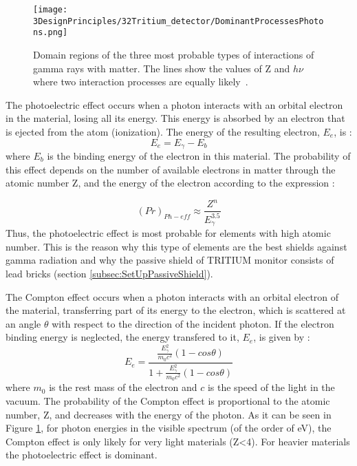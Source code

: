 \begin{figure}[h]
\centering
\texttt{[image: 3DesignPrinciples/32Tritium\_detector/DominantProcessesPhotons.png]}
\caption{Domain regions of the three most probable types of interactions of gamma rays with matter. The lines show the values of Z and $h\nu$ where two interaction processes are equally likely\label{fig:ProcessesPhotons}~\cite{Knoll}.}
\end{figure}

The photoelectric effect occurs when a photon interacts with an orbital electron in the material, losing all its energy. This energy is absorbed by an electron that is ejected from the atom (ionization). The energy of the resulting electron, $E_e$, is \cite{Knoll, Leo}:
\begin{equation}
E_e = E_\gamma - E_b 
\label{eq:PhotoelectricEffect}
\end{equation}
where $E_b$ is the binding energy of the electron in this material. The probability of this effect depends on the number of available electrons in matter through the atomic number Z, and the energy of the electron according to the expression \cite{Knoll}:

\begin{equation}
\left(Pr\right)_{Ph-eff} \approx \frac{Z^n}{E_\gamma^{3.5}}
\label{eq:PhotoelectricProb}
\end{equation}
Thus, the photoelectric effect is most probable for elements with high atomic number. This is the reason why this type of elements are the best shields against gamma radiation and why the passive shield of TRITIUM monitor consists of lead bricks (section \ref{subsec:SetUpPassiveShield}). %

The Compton effect occurs when a photon interacts with an orbital electron of the material, transferring part of its energy to the electron, which is scattered at an angle $\theta$ with respect to the direction of the incident photon. If the electron binding energy is neglected, the energy transfered to it, $E_e$, is given by \cite{Knoll, Leo}:
\begin{equation}
E_e=\frac{\displaystyle{\frac{E_\gamma^2}{m_0c^2}}\left(1-cos\theta\right)}{1+ \displaystyle{\frac{E_\gamma^2}{m_0c^2}}\left(1-cos\theta\right)}
\label{eq:ComptonEffect}
\end{equation}
where $m_0$ is the rest mass of the electron and $c$ is the speed of the light in the vacuum. The probability of the Compton effect is proportional to the atomic number, Z,  and decreases with the energy of the photon. As it can be seen in Figure \ref{fig:ProcessesPhotons}, for photon energies in the visible spectrum (of the order of eV), the Compton effect is only likely for very light materials (Z<4). For heavier materials the photoelectric effect is dominant.


